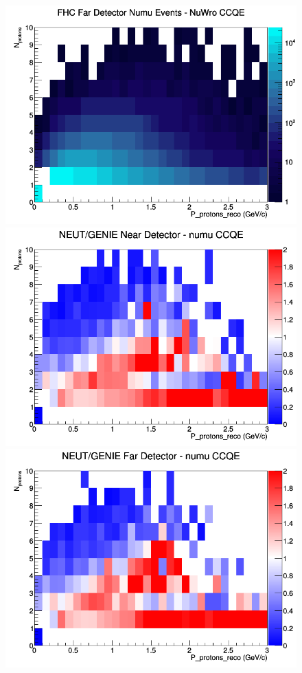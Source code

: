 \documentclass[12pt]{article}
\begin{document}
\begin{figure}[h]
\endminipage
{}
\includegraphics[width=\linewidth]{eff_N_P/LAr/protons/CCQE_FHC_FD_numu_N_P_NuWro.png}
\endminipage
\newline
{}
\includegraphics[width=\linewidth]{eff_N_P/LAr/protons/ratios/CCQE_NEUT_GENIE_numu_near_N_P.png}
\endminipage
{}
\includegraphics[width=\linewidth]{eff_N_P/LAr/protons/ratios/CCQE_NEUT_GENIE_numu_far_N_P.png}

\end{figure}
\end{document}
